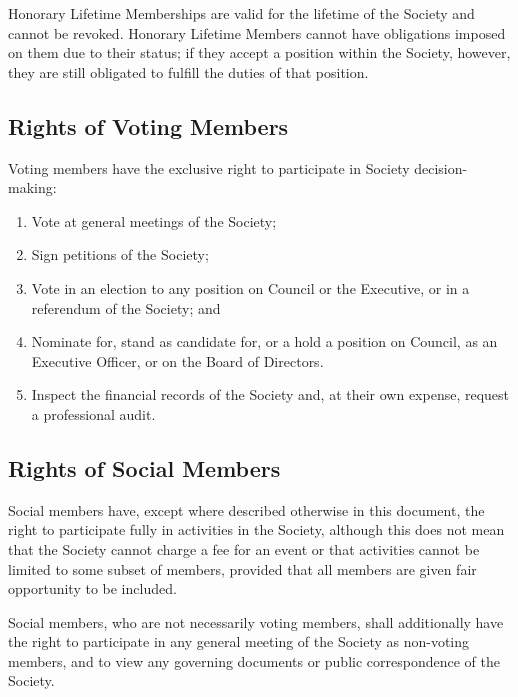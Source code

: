 Honorary Lifetime Memberships are valid for the lifetime of the Society and
cannot be revoked. Honorary Lifetime Members cannot have obligations imposed on
them due to their status; if they accept a position within the Society, however,
they are still obligated to fulfill the duties of that position.

\subsection{Rights of Voting Members}
Voting members have the exclusive right to participate in Society
decision-making:
\begin{enumerate}
  \item Vote at general meetings of the Society;
  \item Sign petitions of the Society;
  \item Vote in an election to any position on Council or the
      Executive, or in a referendum of the Society; and
  \item Nominate for, stand as candidate for, or a hold a position on 
      Council, as an Executive Officer, or on the Board of Directors.
  \item Inspect the financial records of the Society and, at their own expense,
    request a professional audit.
\end{enumerate}

\subsection{Rights of Social Members}
Social members have, except where described otherwise in this document, the
right to participate fully in activities in the Society, although this does not
mean that the Society cannot charge a fee for an event or that activities cannot
be limited to some subset of members, provided that all members are given fair
opportunity to be included.

Social members, who are not necessarily voting members, shall additionally have the right to participate in any general meeting
of the Society as non-voting members, and to view any governing documents or
public correspondence of the Society.

